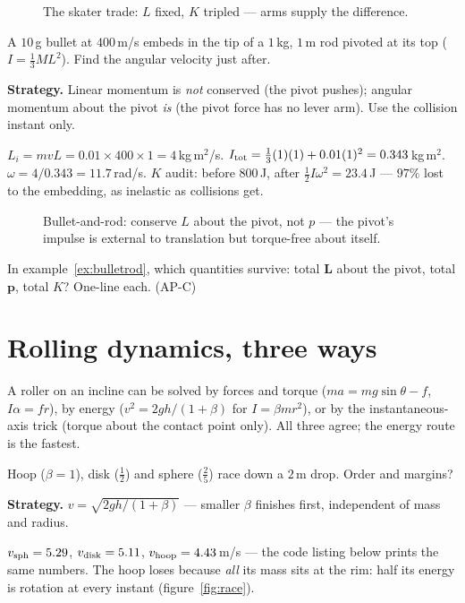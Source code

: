 \begin{figure}[htbp]\centering

\caption{The skater trade: $L$ fixed, $K$ tripled --- arms supply the
difference.}
\label{fig:skater}
\end{figure}

\begin{example}\label{ex:bulletrod}
A $10$\,g bullet at $400$\,m/s embeds in the tip of a $1$\,kg,
$1$\,m rod pivoted at its top ($I=\tfrac13ML^{2}$). Find the angular
velocity just after.
\par\smallskip
\textbf{Strategy.} Linear momentum is \emph{not} conserved (the pivot
pushes); angular momentum about the pivot \emph{is} (the pivot force has
no lever arm). Use the collision instant only.
\begin{solution}
$L_i=mvL=0.01\times400\times1=4$\,kg\,m$^{2}$/s.
$I_{\rm tot}=\tfrac13(1)(1)+0.01(1)^{2}=0.343$\,kg\,m$^{2}$.
$\omega=4/0.343=11.7$\,rad/s. $K$ audit: before $800$\,J, after
$\tfrac12I\omega^{2}=23.4$\,J --- $97\%$ lost to the embedding, as
inelastic as collisions get. \checkmark
\end{solution}
\end{example}

\begin{figure}[htbp]\centering

\caption{Bullet-and-rod: conserve $L$ about the pivot, not $p$ --- the
pivot's impulse is external to translation but torque-free about itself.}
\label{fig:rxp}
\end{figure}

\begin{exercise}[easy]
In example~\ref{ex:bulletrod}, which quantities survive: total $\mathbf L$
about the pivot, total $\mathbf p$, total $K$? One-line each. (AP-C)
\end{exercise}

\section{Rolling dynamics, three ways}\label{sec:ang-roll}

A roller on an incline can be solved by forces and torque
($ma=mg\sin\theta-f$, $I\alpha=fr$), by energy
($v^{2}=2gh/(1+\beta)$ for $I=\beta mr^{2}$), or by the instantaneous-axis
trick (torque about the contact point only). All three agree; the energy
route is the fastest.

\begin{example}\label{ex:race}
Hoop ($\beta=1$), disk ($\tfrac12$) and sphere ($\tfrac25$) race down a
$2$\,m drop. Order and margins?
\par\smallskip
\textbf{Strategy.} $v=\sqrt{2gh/(1+\beta)}$ --- smaller $\beta$ finishes
first, independent of mass and radius.
\begin{solution}
$v_{\rm sph}=5.29$, $v_{\rm disk}=5.11$, $v_{\rm hoop}=4.43$\,m/s ---
the code listing below prints the same numbers. The hoop loses because
\emph{all} its mass sits at the rim: half its energy is rotation at every
instant (figure~\ref{fig:race}). \checkmark
\end{solution}
\end{example}

